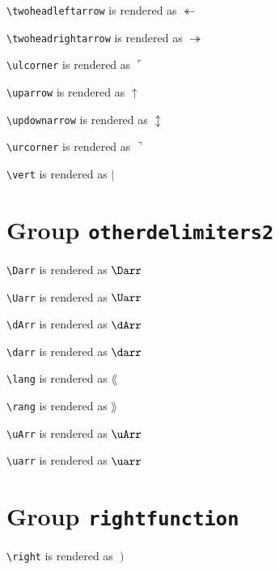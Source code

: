 \texttt{\textbackslash twoheadleftarrow} is rendered as $\twoheadleftarrow$

\texttt{\textbackslash twoheadrightarrow} is rendered as $\twoheadrightarrow$

\texttt{\textbackslash ulcorner} is rendered as $\ulcorner$

\texttt{\textbackslash uparrow} is rendered as $\uparrow$

\texttt{\textbackslash updownarrow} is rendered as $\updownarrow$

\texttt{\textbackslash urcorner} is rendered as $\urcorner$

\texttt{\textbackslash vert} is rendered as $\vert$

\section{ Group \texttt{other\textunderscore delimiters2}}

\texttt{\textbackslash Darr} is rendered as $\Darr$

\texttt{\textbackslash Uarr} is rendered as $\Uarr$

\texttt{\textbackslash dArr} is rendered as $\dArr$

\texttt{\textbackslash darr} is rendered as $\darr$

\texttt{\textbackslash lang} is rendered as $\lang$

\texttt{\textbackslash rang} is rendered as $\rang$

\texttt{\textbackslash uArr} is rendered as $\uArr$

\texttt{\textbackslash uarr} is rendered as $\uarr$

\section{ Group \texttt{right\textunderscore function}}

\texttt{\textbackslash right} is rendered as $\left. \right)$
